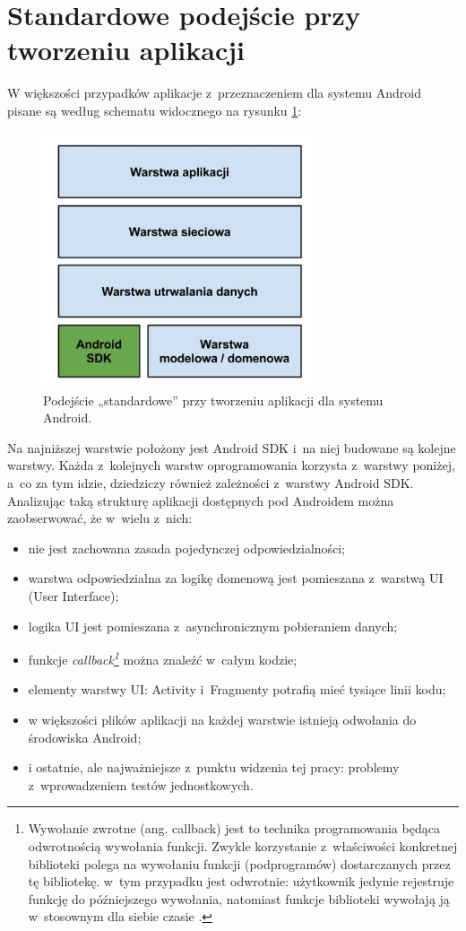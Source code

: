 \section{Standardowe podejście przy tworzeniu aplikacji}
\label{standardowe_podejscie}
W większości przypadków aplikacje z~przeznaczeniem dla systemu Android pisane są według schematu widocznego na rysunku \ref{fig:opis_problemu}:

\begin{figure}[!htb]
    \centering
    \includegraphics[width=8cm]{imgs/ch3_opis_problemu_1.jpg}
    \caption
{Podejście „standardowe” przy tworzeniu aplikacji dla systemu Android.}
    \label{fig:opis_problemu}
\end{figure} 

\newpage
Na najniższej warstwie położony jest Android SDK i~na niej budowane są kolejne warstwy. Każda z~kolejnych warstw oprogramowania korzysta z~warstwy poniżej, a~co za tym idzie, dziedziczy również zależności z~warstwy Android SDK. Analizując taką strukturę aplikacji dostępnych pod Androidem można zaobserwować, że w~wielu z~nich:
\begin{itemize}
\item
nie jest zachowana zasada pojedynczej odpowiedzialności;
\item
warstwa odpowiedzialna za logikę domenową jest pomieszana z~warstwą UI (User Interface);
\item
logika UI jest pomieszana z~asynchronicznym pobieraniem danych;
\item
funkcje \textit{callback\footnote{Wywołanie zwrotne (ang. callback) jest to technika programowania będąca odwrotnością wywołania funkcji. Zwykle korzystanie z~właściwości konkretnej biblioteki polega na wywołaniu funkcji (podprogramów) dostarczanych przez tę bibliotekę. w~tym przypadku jest odwrotnie: użytkownik jedynie rejestruje funkcję do późniejszego wywołania, natomiast funkcje biblioteki wywołają ją w~stosownym dla siebie czasie  \cite{website:wikipedia}.}} można znaleźć w~całym kodzie;
\item
elementy warstwy UI: Activity i~Fragmenty potrafią mieć tysiące linii kodu;
\item
w większości plików aplikacji na każdej warstwie istnieją odwołania do środowiska Android;
\item
i ostatnie, ale najważniejsze z~punktu widzenia tej pracy: problemy z~wprowadzeniem testów jednostkowych.
\end{itemize}

